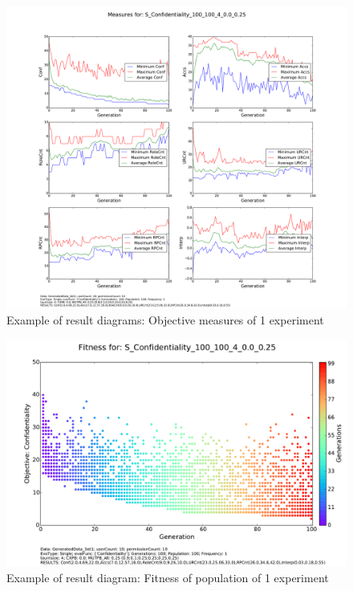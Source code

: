     \begin{figure}[H]
        \centering
        \includegraphics[scale=0.35]{./Figures/testresult2}
        \caption{Example of result diagrams: Objective measures of 1 experiment}
        \label{fig:testresult2}
    \end{figure}
    
    \begin{figure}[H]
        \centering
        \includegraphics[scale=0.4]{./Figures/testresult3}
        \caption{Example of result diagram: Fitness of population of 1 experiment}
        \label{fig:testresult3}
    \end{figure}
    
